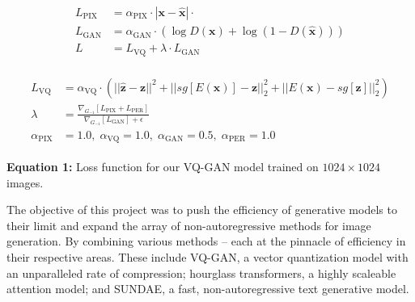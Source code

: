 \documentclass[14pt,margin=0.5in,innermargin=0in,blockverticalspace=-0.1in,colspace=-1.2cm]{tikzposter}
\begin{document}
\begin{columns}
{\begin{tcolorbox}[boxsep=0pt,top=0cm,adjusted title={\huge\bf Proposed Method},colbacktitle=colorOne]
        \begin{minipage}{0.40\linewidth}
            \begin{align*}
            \begin{split}
                L_\text{PIX} &= \alpha_\text{PIX} \cdot |\mathbf{x} -
                \hat{\mathbf{x}}| \cdot \\
                L_\text{GAN} &= \alpha_\text{GAN} \cdot \left(\log D(\mathbf{x}) + \log
                (1-D(\hat{\mathbf{x}}))\right) \\
                L &= L_\text{VQ} + \lambda \cdot L_\text{GAN}
            \end{split}
            \end{align*}
        \end{minipage}
        \begin{minipage}{0.59\linewidth}
            \begin{align*}
            \begin{split}
                L_\text{VQ} &= \alpha_\text{VQ} \cdot \left(||\hat{\mathbf{z}} -
                \mathbf{z}||^2 + ||sg[E(\mathbf{x})] - \mathbf{z}||^2_2 +
                ||E(\mathbf{x}) -
                sg[\mathbf{z}]||^2_2\right)\\
                \lambda &= \frac{\nabla_{G_{-1}}[L_\text{PIX} +
                L_\text{PER}]}{\nabla_{G_{-1}}[L_\text{GAN}] + \epsilon}\\
                \alpha_\text{PIX} &= 1.0,\; \alpha_\text{VQ} = 1.0,\; \alpha_\text{GAN} = 0.5,\; \alpha_\text{PER} = 1.0
            \end{split}
            \end{align*}
        \end{minipage}
        \vspace{0.4cm}

        \Large
        \textbf{Equation 1:} Loss function for our VQ-GAN model trained on $1024
        \times 1024$ images.
        \vspace{0.3cm}

        The objective of this project was to push the efficiency of generative
        models to their limit and expand the array of non-autoregressive methods
        for image generation. By combining various methods -- each at the
        pinnacle of efficiency in their respective areas. These include VQ-GAN, a
        vector quantization model with an unparalleled rate of compression;
        hourglass transformers, a highly scaleable attention model; and SUNDAE,
        a fast, non-autoregressive text generative model.


\end{tcolorbox}}
\end{columns}
\end{document}
